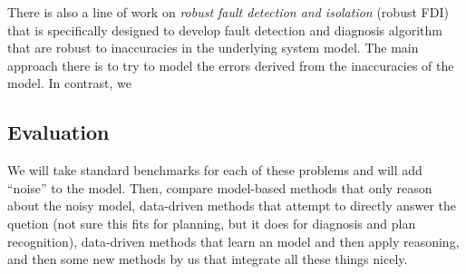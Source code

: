 \documentclass[12pt]{article}
\begin{document}
There is also a line of work on {\em robust fault detection and isolation} (robust FDI)~\cite{chen2012robust} that is specifically designed to develop fault detection and diagnosis algorithm that are robust to inaccuracies in the underlying system model. The main approach there is to try to model the errors derived from the inaccuracies of the model. In contrast, we 











\subsection{Evaluation}

We will take standard benchmarks for each of these problems and will add ``noise'' to the model. Then, compare model-based methods that only reason about the noisy model, data-driven methods that attempt to directly answer the quetion (not sure this fits for planning, but it does for diagnosis and plan recognition), data-driven methods that learn an model and then apply reasoning, 
and then some new methods by us that integrate all these things nicely. 
\end{document}
